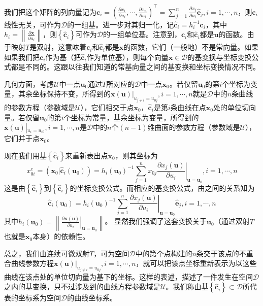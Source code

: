 \documentclass[main.tex]{subfiles}
\begin{document}
我们把这个矩阵的列向量记为$\mathbf{c}_i=\left(\frac{\partial x_1}{\partial u_i},\cdots,\frac{\partial x_n}{\partial u_i}\right)^\intercal=\sum_{j=1}^n\frac{\partial x_j}{\partial u_i}\mathbf{\hat{e}}_j,i=1,\cdots,n$，则$\mathbf{c}_i$线性无关，可作为$\mathcal{D}$的一组基。进一步对其归一化，记$\mathbf{\hat{c}}_i=h_i^{-1}\mathbf{c}_i$，其中$h_i=\left\|\frac{\partial\mathbf{x}}{\partial u_i}\right\|$，则$\left\{\mathbf{\hat{c}}_i\right\}$可作为$\mathcal{D}$的一组单位基。注意到，$\mathbf{c}_i$和$\mathbf{\hat{c}}_i$都是$\mathbf{u}$的函数。由于映射$T$是双射，这意味着$\mathbf{c}_i$和$\mathbf{\hat{c}}_i$都是$\mathbf{x}$的函数，它们（一般地）不是常向量。如果如果我们把$\mathbf{c}_i$作为基（把$\mathbf{\hat{c}}_i$作为单位基），则每个向量$\mathbf{x}\in\mathcal{D}$的基变换与坐标变换公式都是不同的。这跟以往我们知道的常基向量之间的基变换和坐标变换情况不同。

几何方面，考虑$\mathcal{U}$中一点$\mathbf{u}_0$通过$T$所对应的$\mathcal{D}$中一点$\mathbf{x}_0$。若仅留$\mathbf{u}_0$的第$i$个坐标为变量，其余坐标保持不变，所得到的$\left.\mathbf{x}\left(\mathbf{u}\right)\right|_{u_{j\neq i}=u_{0j}},i=1,\cdots,n$就是$\mathcal{D}$中的$n$条曲线的参数方程（参数域是$\mathcal{U}$），它们相交于点$\mathbf{x}_0$，$\mathbf{\hat{c}}_i$是第$i$条曲线在点$\mathbf{x}_0$处的单位切向量。若仅留$\mathbf{u}_0$的第$i$个坐标为常量，基余坐标为变量，所得到的$\mathbf{x}\left(\mathbf{u}\right)\left|_{u_i=u_{i0}}\right.,i=1,\cdots,n$是$\mathcal{D}$中的$n$个$\left(n-1\right)$维曲面的参数方程（参数域是$\mathcal{U}$），它们并于点$\mathbf{x}_0$。

现在我们用基$\left\{\mathbf{\hat{c}}_i\right\}$来重新表出点$\mathbf{x}_0$，则其坐标为
\[x_{0i}^\mathrm{c}=\left(\mathbf{x}_0|\mathbf{\hat{c}}_i\left(\mathbf{u}_0\right)\right)=h_i\left(\mathbf{u}_0\right)^{-1}\sum_{j=1}^nx_{0j}\left.\frac{\partial x_j\left(\mathbf{u}\right)}{\partial u_i}\right|_{\mathbf{u}=\mathbf{u}_0},i=1,\cdots,n\]
这是由$\left\{\mathbf{\hat{e}}_i\right\}$到$\left\{\mathbf{\hat{c}}_i\right\}$的坐标变换公式。而相应的基变换公式，由之间的关系知为
\[\mathbf{\hat{c}}_i\left(\mathbf{u}_0\right)=h_i\left(\mathbf{u}_0\right)^{-1}\sum_{j=1}^n\left.\frac{\partial x_j\left(\mathbf{u}\right)}{\partial u_i}\right|_{\mathbf{u}=\mathbf{u}_0}\mathbf{\hat{e}}_j,i=1,\cdots,n\]
其中$h_i\left(\mathbf{u}_0\right)=\left\|\left.\frac{\partial \mathbf{x}\left(\mathbf{u}\right)}{\partial u_i}\right|_{\mathbf{u}=\mathbf{u}_0}\right\|$。
显然我们强调了这套变换关于$\mathbf{u}_0$（通过双射$T$也就是$\mathbf{x}_0$本身）的依赖性。

总之，我们由连续可微双射$T$，可为空间$\mathcal{D}$中的第个点构建的$n$条交于该点的不重合曲线参数方程$\left.\mathbf{x}\left(\mathbf{u}\right)\right|_{u_{j\neq i}=u_{0j}},i=1,\cdots,n$，就可以把该点坐标重新表示为以这些曲线在该点处的单位切向量为基下的坐标。这样的表述，描述了一件发生在空间$\mathcal{D}$之内的基变换，只不过涉及到的曲线方程参数域是$\mathcal{U}$。我们称由基$\left\{\mathbf{\hat{c}}_i\right\}\subset\mathcal{D}$所代表的坐标系为空间$\mathcal{D}$的曲线坐标系。
\end{document}
